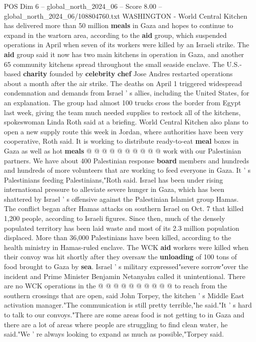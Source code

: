 \begin{textsample}{POS Dim 6 – global\_north\_2024\_06 – Score 8.00 – global\_north\_2024\_06/108804760.txt}  \label{ex:f6_pos_140}
WASHINGTON - World Central Kitchen has delivered more than 50 million \textbf{meals} in Gaza and hopes to continue to expand in the wartorn area, according to the \textbf{aid} group, which suspended operations in April when seven of its workers were killed by an Israeli strike.
The \textbf{aid} group said it now has two main kitchens in operation in Gaza, and another 65 community kitchens spread throughout the small seaside enclave.
The U.S.-based \textbf{charity} founded by \textbf{celebrity} \textbf{chef} Jose Andres restarted operations about a month after the air strike.
The deaths on April 1 triggered widespread condemnation and demands from Israel ' s allies, including the United States, for an explanation.
The group had almost 100 trucks cross the border from Egypt last week, giving the team much needed supplies to restock all of the kitchens, spokeswoman Linda Roth said at a briefing.
World Central Kitchen also plans to open a new supply route this week in Jordan, where authorities have been very cooperative, Roth said.
It is working to distribute ready-to-eat \textbf{meal} boxes in Gaza as well as hot \textbf{meals} @ @ @ @ @ @ @ @ @ @ work with our Palestinian partners.
We have about 400 Palestinian response \textbf{board} members and hundreds and hundreds of more volunteers that are working to feed everyone in Gaza.
It ' s Palestinians feeding Palestinians,"Roth said.
Israel has been under rising international pressure to alleviate severe hunger in Gaza, which has been shattered by Israel ' s offensive against the Palestinian Islamist group Hamas.
The conflict began after Hamas attacks on southern Israel on Oct. 7 that killed 1,200 people, according to Israeli figures.
Since then, much of the densely populated territory has been laid waste and most of its 2.3 million population displaced.
More than 36,000 Palestinians have been killed, according to the health ministry in Hamas-ruled enclave.
The WCK \textbf{aid} workers were killed when their convoy was hit shortly after they oversaw the \textbf{unloading} of 100 tons of food brought to Gaza by \textbf{sea}.
Israel ' s military expressed"severe sorrow"over the incident and Prime Minister Benjamin Netanyahu called it unintentional.
There are no WCK operations in the @ @ @ @ @ @ @ @ @ @ to reach from the southern crossings that are open, said John Torpey, the kitchen ' s Middle East activation manager."The communication is still pretty terrible,"he said."It ' s hard to talk to our convoys."There are some areas food is not getting to in Gaza and there are a lot of areas where people are struggling to find clean water, he said."We ' re always looking to expand as much as possible,"Torpey said.

\end{textsample}
